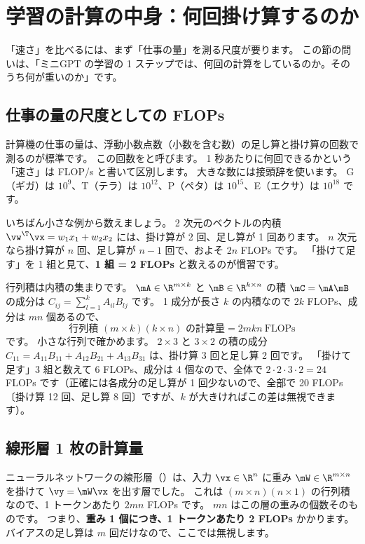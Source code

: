 \section{学習の計算の中身：何回掛け算するのか}\label{sec:gpu-flops}

「速さ」を比べるには、まず「仕事の量」を測る尺度が要ります。
この節の問いは、「ミニGPT の学習の 1 ステップでは、何回の計算をしているのか。そのうち何が重いのか」です。

\subsection*{仕事の量の尺度としての FLOPs}

計算機の仕事の量は、浮動小数点数（小数を含む数）の足し算と掛け算の回数で測るのが標準です。
この回数をと呼びます。
1 秒あたりに何回できるかという「速さ」は FLOP/s と書いて区別します。
大きな数には接頭辞を使います。
G（ギガ）は $10^9$、T（テラ）は $10^{12}$、P（ペタ）は $10^{15}$、E（エクサ）は $10^{18}$ です。

いちばん小さな例から数えましょう。
2 次元のベクトルの内積 $\vw^\T\vx = w_1x_1 + w_2x_2$ には、掛け算が 2 回、足し算が 1 回あります。
$n$ 次元なら掛け算が $n$ 回、足し算が $n-1$ 回で、およそ $2n$ FLOPs です。
「掛けて足す」を 1 組と見て、\textbf{1 組 = 2 FLOPs} と数えるのが慣習です。

行列積は内積の集まりです。
$\mA\in\R^{m\times k}$ と $\mB\in\R^{k\times n}$ の積 $\mC=\mA\mB$ の成分は $C_{ij}=\sum_{l=1}^{k}A_{il}B_{lj}$ です。
1 成分が長さ $k$ の内積なので $2k$ FLOPs、成分は $mn$ 個あるので、
\begin{equation}
  \text{行列積 } (m\times k)(k\times n) \text{ の計算量} = 2mkn \ \text{FLOPs}
  \label{eq:gpu-matmul-flops}
\end{equation}
です。
小さな行列で確かめます。
$2\times3$ と $3\times2$ の積の成分 $C_{11}=A_{11}B_{11}+A_{12}B_{21}+A_{13}B_{31}$ は、掛け算 3 回と足し算 2 回です。
「掛けて足す」3 組と数えて 6 FLOPs、成分は 4 個なので、全体で $2\cdot2\cdot3\cdot2=24$ FLOPs です（正確には各成分の足し算が 1 回少ないので、全部で 20 FLOPs〔掛け算 12 回、足し算 8 回〕ですが、$k$ が大きければこの差は無視できます）。

\subsection*{線形層 1 枚の計算量}

ニューラルネットワークの線形層（）は、入力 $\vx\in\R^{n}$ に重み $\mW\in\R^{m\times n}$ を掛けて $\vy=\mW\vx$ を出す層でした。
これは $(m\times n)(n\times1)$ の行列積なので、1 トークンあたり $2mn$ FLOPs です。
$mn$ はこの層の重みの個数そのものです。
つまり、\textbf{重み 1 個につき、1 トークンあたり 2 FLOPs} かかります。
バイアスの足し算は $m$ 回だけなので、ここでは無視します。

